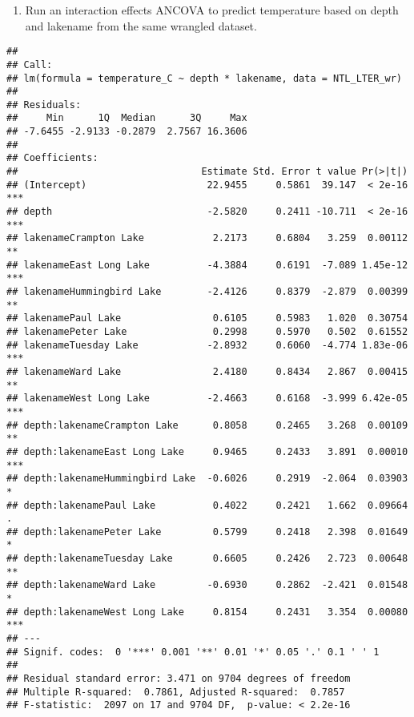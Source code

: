 \documentclass[]{article}
\newenvironment{Shaded}{\begin{snugshade}}{\end{snugshade}}
\newcommand{\CommentTok}[1]{\textcolor[rgb]{0.56,0.35,0.01}{\textit{#1}}}
\newcommand{\DataTypeTok}[1]{\textcolor[rgb]{0.13,0.29,0.53}{#1}}
\newcommand{\FloatTok}[1]{\textcolor[rgb]{0.00,0.00,0.81}{#1}}
\newcommand{\KeywordTok}[1]{\textcolor[rgb]{0.13,0.29,0.53}{\textbf{#1}}}
\newcommand{\NormalTok}[1]{#1}
\newcommand{\OperatorTok}[1]{\textcolor[rgb]{0.81,0.36,0.00}{\textbf{#1}}}
\newcommand{\StringTok}[1]{\textcolor[rgb]{0.31,0.60,0.02}{#1}}
\providecommand{\tightlist}{%
  \setlength{\itemsep}{0pt}\setlength{\parskip}{0pt}}
\begin{document}
\begin{enumerate}
\def\labelenumi{\arabic{enumi}.}
\setcounter{enumi}{5}
\tightlist
\item
  Run an interaction effects ANCOVA to predict temperature based on
  depth and lakename from the same wrangled dataset.
\end{enumerate}

\begin{Shaded}
\end{Shaded}

\begin{verbatim}
## 
## Call:
## lm(formula = temperature_C ~ depth * lakename, data = NTL_LTER_wr)
## 
## Residuals:
##     Min      1Q  Median      3Q     Max 
## -7.6455 -2.9133 -0.2879  2.7567 16.3606 
## 
## Coefficients:
##                                Estimate Std. Error t value Pr(>|t|)    
## (Intercept)                     22.9455     0.5861  39.147  < 2e-16 ***
## depth                           -2.5820     0.2411 -10.711  < 2e-16 ***
## lakenameCrampton Lake            2.2173     0.6804   3.259  0.00112 ** 
## lakenameEast Long Lake          -4.3884     0.6191  -7.089 1.45e-12 ***
## lakenameHummingbird Lake        -2.4126     0.8379  -2.879  0.00399 ** 
## lakenamePaul Lake                0.6105     0.5983   1.020  0.30754    
## lakenamePeter Lake               0.2998     0.5970   0.502  0.61552    
## lakenameTuesday Lake            -2.8932     0.6060  -4.774 1.83e-06 ***
## lakenameWard Lake                2.4180     0.8434   2.867  0.00415 ** 
## lakenameWest Long Lake          -2.4663     0.6168  -3.999 6.42e-05 ***
## depth:lakenameCrampton Lake      0.8058     0.2465   3.268  0.00109 ** 
## depth:lakenameEast Long Lake     0.9465     0.2433   3.891  0.00010 ***
## depth:lakenameHummingbird Lake  -0.6026     0.2919  -2.064  0.03903 *  
## depth:lakenamePaul Lake          0.4022     0.2421   1.662  0.09664 .  
## depth:lakenamePeter Lake         0.5799     0.2418   2.398  0.01649 *  
## depth:lakenameTuesday Lake       0.6605     0.2426   2.723  0.00648 ** 
## depth:lakenameWard Lake         -0.6930     0.2862  -2.421  0.01548 *  
## depth:lakenameWest Long Lake     0.8154     0.2431   3.354  0.00080 ***
## ---
## Signif. codes:  0 '***' 0.001 '**' 0.01 '*' 0.05 '.' 0.1 ' ' 1
## 
## Residual standard error: 3.471 on 9704 degrees of freedom
## Multiple R-squared:  0.7861, Adjusted R-squared:  0.7857 
## F-statistic:  2097 on 17 and 9704 DF,  p-value: < 2.2e-16
\end{verbatim}
\end{document}
